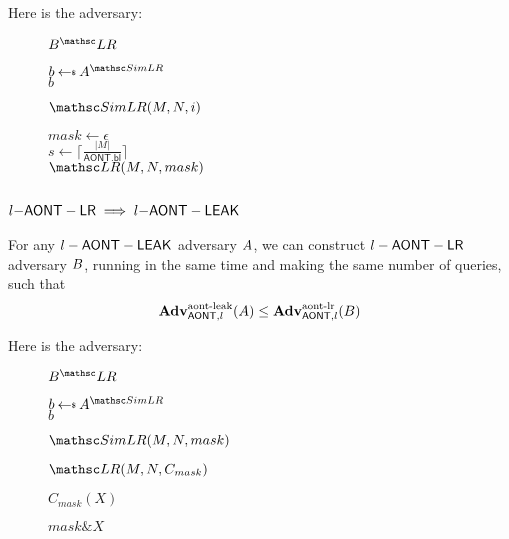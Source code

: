 \documentclass[11pt,twoside]{article}
\begin{document}
Here is the adversary:

\begin{figure}[H]
{
\underline{$\advB^\LRO$}

\begin{algorithm}[H]
$b\getsr \advA^{\procfont{SimLR}}$\\
\Return $b$
\end{algorithm}

\underline{$\procfont{SimLR}(M,N,i)$}

\begin{algorithm}[H]
$mask\gets \epsilon$\\
$s\gets \lceil\frac{|M|}{\mathsf{AONT.bl}}\rceil$\\
{
}
\Return $\LRO(M,N,mask)$
\end{algorithm}
}
\end{figure}

\subsection{$l\mathsf{-AONT-LR}\implies l\mathsf{-AONT-LEAK}$}

\begin{theorem}
For any $l-\mathsf{AONT-LEAK}$ adversary $A$, we can construct $l-\mathsf{AONT-LR}$ adversary $B$, running in the same time and making the same number of queries, such that $$\textbf{Adv}^\text{aont-leak}_{\mathsf{AONT},l}(A)\le\textbf{Adv}^\text{aont-lr}_{\mathsf{AONT},l}(B)$$
\end{theorem}

Here is the adversary:

\begin{figure}[H]
{
\underline{$\advB^\LRO$}

\begin{algorithm}[H]
$b\getsr \advA^{\procfont{SimLR}}$\\
\Return $b$
\end{algorithm}

\underline{$\procfont{SimLR}(M,N,mask)$}

\begin{algorithm}[H]
\Return $\LRO(M,N,C_{mask})$
\end{algorithm}

\underline{$C_{mask}(X)$}

\begin{algorithm}[H]
\Return $mask \mathrel{\&} X$
\end{algorithm}
}
\end{figure}
\end{document}
